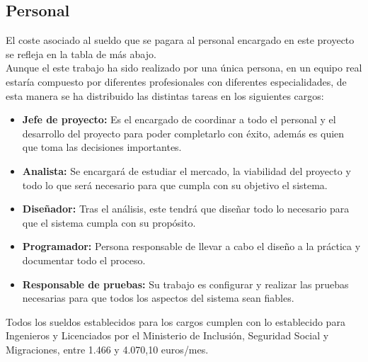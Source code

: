\subsection{Personal}
El coste asociado al sueldo que se pagara al personal encargado en este proyecto se refleja en la tabla de más abajo. \\ Aunque el este trabajo ha sido realizado por una única persona, en un equipo real estaría compuesto por diferentes profesionales con diferentes especialidades, de esta manera se ha distribuido las distintas tareas en los siguientes cargos:
\begin{itemize}
	\item \textbf{Jefe de proyecto:} Es el encargado de coordinar a todo el personal y el desarrollo del proyecto para poder completarlo con éxito, además es quien que toma las decisiones importantes.
	\item \textbf{Analista:} Se encargará de estudiar el mercado, la viabilidad del proyecto y todo lo que será necesario para que cumpla con su objetivo el sistema.
	\item \textbf{Diseñador:} Tras el análisis, este tendrá que diseñar todo lo necesario para que el sistema cumpla con su propósito.
	\item \textbf{Programador:} Persona responsable de llevar a cabo el diseño a la práctica y documentar todo el proceso.
	\item \textbf{Responsable de pruebas:} Su trabajo es configurar y realizar las pruebas necesarias para que todos los aspectos del sistema sean fiables.
\end{itemize}
\noindent
Todos los sueldos establecidos para los cargos cumplen con lo establecido para Ingenieros y Licenciados por el Ministerio de Inclusión, Seguridad Social y Migraciones\cite{noauthor_seguridad_nodate}, entre 1.466 y 4.070,10 euros/mes.

